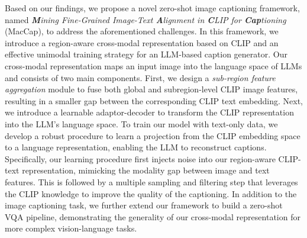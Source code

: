Based on our findings, we propose a novel zero-shot image captioning framework, named \textit{\textbf{M}ining Fine-Grained Image-Text \textbf{A}lignment in \textbf{C}LIP for \textbf{Cap}tioning} (MacCap), to address the aforementioned challenges. In this framework, we introduce a region-aware cross-modal representation based on CLIP and an effective unimodal training strategy for an LLM-based caption generator. Our cross-modal representation maps an input image into the language space of LLMs and consists of two main components. First, we design a \textit{sub-region feature aggregation} module to fuse both global and subregion-level CLIP image features, resulting in a smaller gap between the corresponding CLIP text embedding. Next, we introduce a learnable adaptor-decoder to transform the CLIP representation into the LLM's language space.
To train our model with text-only data, we develop a robust procedure to learn a projection from the CLIP embedding space to a language representation, enabling the LLM to reconstruct captions. Specifically, our learning procedure first injects noise into our region-aware CLIP-text representation, mimicking the modality gap between image and text features. This is followed by a multiple sampling and filtering step that leverages the CLIP knowledge to improve the quality of the captioning.
In addition to the image captioning task, we further extend our framework to build a zero-shot VQA pipeline, demonstrating the generality of our cross-modal representation for more complex vision-language tasks.



